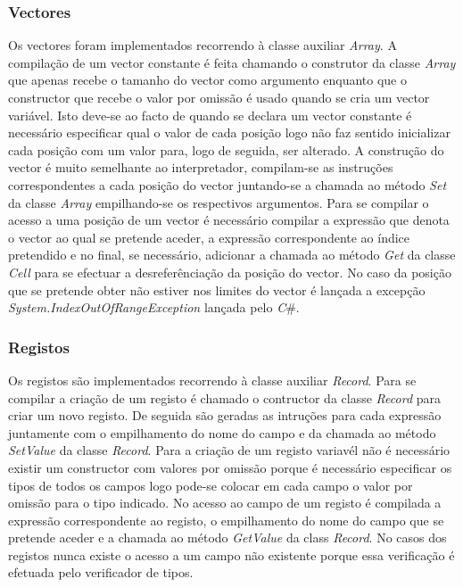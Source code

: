 \subsubsection{Vectores}

Os vectores foram implementados recorrendo à classe auxiliar \emph{Array}.
A compilação de um vector constante é feita chamando o construtor da classe 
\emph{Array} que apenas recebe o tamanho do vector como argumento enquanto que 
o constructor que recebe o valor por omissão é usado quando se cria um vector 
variável. Isto deve-se ao facto de quando se declara um vector constante é 
necessário especificar qual o valor de cada posição logo não faz sentido 
inicializar cada posição com um valor para, logo de seguida, ser alterado. 
A construção do vector é muito semelhante ao interpretador, compilam-se as 
instruções correspondentes a cada posição do vector juntando-se a chamada ao 
método \emph{Set} da classe \emph{Array} empilhando-se os respectivos 
argumentos.
Para se compilar o acesso a uma posição de um vector é necessário compilar a 
expressão que denota o vector ao qual se pretende aceder, a expressão 
correspondente ao índice pretendido e no final, se necessário, adicionar a 
chamada ao método \emph{Get} da classe \emph{Cell} para se efectuar a 
desreferênciação da posição do vector. No caso da posição que se pretende obter 
não estiver nos limites do vector é lançada a excepção 
\emph{System.IndexOutOfRangeException} lançada pelo \emph{C}\#.

\subsubsection{Registos}

Os registos são implementados recorrendo à classe auxiliar \emph{Record}.
Para se compilar a criação de um registo é chamado o contructor da classe 
\emph{Record} para criar um novo registo. De seguida são geradas as intruções 
para cada expressão juntamente com o empilhamento do nome do campo e da chamada 
ao método \emph{SetValue} da classe \emph{Record}. Para a criação de um registo 
variavél não é necessário existir um constructor com valores por omissão porque 
é necessário especificar os tipos de todos os campos logo pode-se colocar em 
cada campo o valor por omissão para o tipo indicado.
No acesso ao campo de um registo é compilada a expressão correspondente ao 
registo, o empilhamento do nome do campo que se pretende aceder e a chamada 
ao método \emph{GetValue} da class \emph{Record}.
No casos dos registos nunca existe o acesso a um campo não existente porque 
essa verificação é efetuada pelo verificador de tipos.

